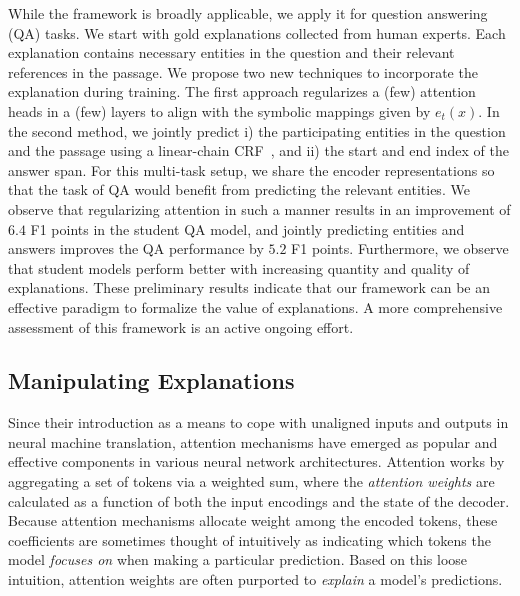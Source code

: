 \documentclass{article}
\begin{document}
While the framework is broadly applicable, 
we apply it 
for question answering (QA) tasks.
We start with 
gold explanations 
collected 
from human experts.
Each explanation
contains 
necessary entities in the question and their relevant references in the passage.
We propose two new techniques 
to incorporate 
the explanation during training.
The first approach 
regularizes a (few) attention heads in a (few) layers 
to align with the symbolic mappings given by $e_t(x)$.
In the second method, 
we jointly 
predict i) the participating entities in the question and the passage using a linear-chain CRF~\cite{lafferty2001conditional},  
and ii) the start and end index of the answer span. 
For this multi-task
setup, we share the encoder representations
so that the task of QA would benefit from 
predicting 
the relevant entities.
We observe that regularizing
attention in such a manner results 
in an improvement of $6.4$ F1 points in the student QA model,
and jointly predicting entities and answers improves
the QA performance by $5.2$ F1 points.
Furthermore, 
we observe that student models perform better
with increasing quantity 
and quality of explanations.
These preliminary results
indicate that our framework
can be an effective  paradigm
to formalize the value of explanations. 
A 
more comprehensive
assessment of 
this framework 
is an active ongoing effort.







\subsection{Manipulating Explanations}
\label{attention}

Since their introduction as a means to cope with
unaligned inputs and outputs in neural machine translation,
attention mechanisms 
have emerged as popular and effective components
in various
neural network architectures.
Attention works by aggregating a set of tokens via a weighted sum,
where the \emph{attention weights} are calculated 
as a function of both the input encodings and the state of the decoder. 
Because attention mechanisms allocate weight among the encoded tokens,
these coefficients are sometimes thought of intuitively
as indicating which tokens the model \emph{focuses on} 
when making a particular prediction. 
Based on this loose intuition, attention weights 
are often purported to \emph{explain} a model's predictions.
\end{document}
